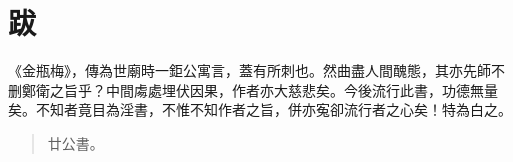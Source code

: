\chapter*{跋}


《金瓶梅》，傳為世廟時一鉅公寓言，蓋有所刺也。然曲盡人間醜態，其亦先師不删鄭衛之旨乎？中間䖏處埋伏因果，作者亦大慈悲矣。今後流行此書，功德無量矣。不知者竟目為淫書，不惟不知作者之旨，併亦寃卻流行者之心矣！特為白之。

\begin{quotation}\begin{flushright}廿公書。\end{flushright}\end{quotation}

